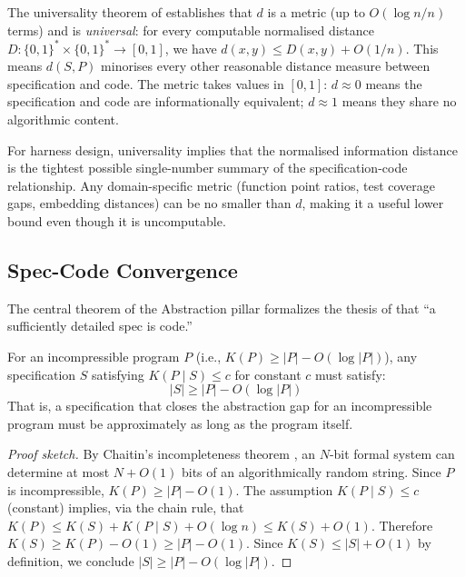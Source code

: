 The universality theorem of \citet{li2004similarity} establishes that $d$ is a metric (up to $O(\log n / n)$ terms) and is \emph{universal}: for every computable normalised distance $D: \{0,1\}^* \times \{0,1\}^* \to [0,1]$, we have $d(x, y) \leq D(x, y) + O(1/n)$. This means $d(S, P)$ minorises every other reasonable distance measure between specification and code. The metric takes values in $[0, 1]$: $d \approx 0$ means the specification and code are informationally equivalent; $d \approx 1$ means they share no algorithmic content.

For harness design, universality implies that the normalised information distance is the tightest possible single-number summary of the specification-code relationship. Any domain-specific metric (function point ratios, test coverage gaps, embedding distances) can be no smaller than $d$, making it a useful lower bound even though it is uncomputable.

\subsection{Spec-Code Convergence}

The central theorem of the Abstraction pillar formalizes the thesis of \citet{gonzalez2026spec} that ``a sufficiently detailed spec is code.''

\begin{theorem}
\label{thm:convergence}
For an incompressible program $P$ (i.e., $K(P) \geq |P| - O(\log |P|)$), any specification $S$ satisfying $K(P \mid S) \leq c$ for constant $c$ must satisfy:
\begin{equation}
    |S| \geq |P| - O(\log |P|)
\end{equation}
That is, a specification that closes the abstraction gap for an incompressible program must be approximately as long as the program itself.
\end{theorem}

\begin{proof}[Proof sketch]
By Chaitin's incompleteness theorem \citep{chaitin1966length}, an $N$-bit formal system can determine at most $N + O(1)$ bits of an algorithmically random string. Since $P$ is incompressible, $K(P) \geq |P| - O(1)$. The assumption $K(P \mid S) \leq c$ (constant) implies, via the chain rule, that $K(P) \leq K(S) + K(P \mid S) + O(\log n) \leq K(S) + O(1)$. Therefore $K(S) \geq K(P) - O(1) \geq |P| - O(1)$. Since $K(S) \leq |S| + O(1)$ by definition, we conclude $|S| \geq |P| - O(\log |P|)$.
\end{proof}


